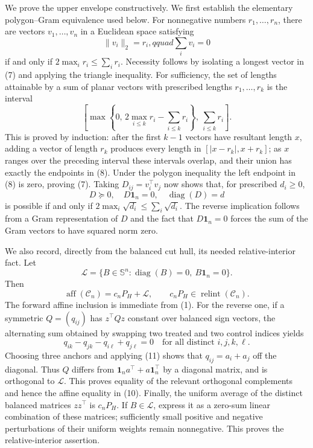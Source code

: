 We prove the upper envelope constructively.  We first establish the elementary polygon--Gram equivalence used below.  For nonnegative numbers \(r_1,\ldots,r_n\), there are vectors \(v_1,\ldots,v_n\) in a Euclidean space satisfying
\[
\|v_i\|_2=r_i,qquad \sum_i v_i=0
\tag{7}
\]
if and only if \(2\max_i r_i\leq\sum_i r_i\).  Necessity follows by isolating a longest vector in (7) and applying the triangle inequality.  For sufficiency, the set of lengths attainable by a sum of planar vectors with prescribed lengths \(r_1,\ldots,r_k\) is the interval
\[
\left[\max\left\{0,\,2\max_{i\leq k}r_i-\sum_{i\leq k}r_i\right\},\ 
\sum_{i\leq k}r_i\right].
\tag{8}
\]
This is proved by induction: after the first \(k-1\) vectors have resultant length \(x\), adding a vector of length \(r_k\) produces every length in \([|x-r_k|,x+r_k]\); as \(x\) ranges over the preceding interval these intervals overlap, and their union has exactly the endpoints in (8).  Under the polygon inequality the left endpoint in (8) is zero, proving (7).  Taking \(D_{ij}=v_i^\top v_j\) now shows that, for prescribed \(d_i\geq0\),
\[
D\succeq0,\quad D\mathbf1_n=0,\quad \operatorname{diag}(D)=d
\tag{9}
\]
is possible if and only if \(2\max_i\sqrt{d_i}\leq\sum_i\sqrt{d_i}\).  The reverse implication follows from a Gram representation of \(D\) and the fact that \(D\mathbf1_n=0\) forces the sum of the Gram vectors to have squared norm zero.

We also record, directly from the balanced cut hull, its needed relative-interior fact.  Let
\[
\mathcal L=\{B\in\mathbb S^n:\operatorname{diag}(B)=0,\ B\mathbf1_n=0\}.
\]
Then
\[
\operatorname{aff}(\mathcal C_n)=c_nP_H+\mathcal L,
\qquad c_nP_H\in\operatorname{relint}(\mathcal C_n).
\tag{10}
\]
The forward affine inclusion is immediate from (1).  For the reverse one, if a symmetric \(Q=(q_{ij})\) has \(z^\top Qz\) constant over balanced sign vectors, the alternating sum obtained by swapping two treated and two control indices yields
\[
q_{ik}-q_{jk}-q_{i\ell}+q_{j\ell}=0
\quad\text{for all distinct }i,j,k,\ell.
\tag{11}
\]
Choosing three anchors and applying (11) shows that \(q_{ij}=a_i+a_j\) off the diagonal.  Thus \(Q\) differs from \(\mathbf1_na^\top+a\mathbf1_n^\top\) by a diagonal matrix, and is orthogonal to \(\mathcal L\).  This proves equality of the relevant orthogonal complements and hence the affine equality in (10).  Finally, the uniform average of the distinct balanced matrices \(zz^\top\) is \(c_nP_H\).  If \(B\in\mathcal L\), express it as a zero-sum linear combination of these matrices; sufficiently small positive and negative perturbations of their uniform weights remain nonnegative.  This proves the relative-interior assertion.

